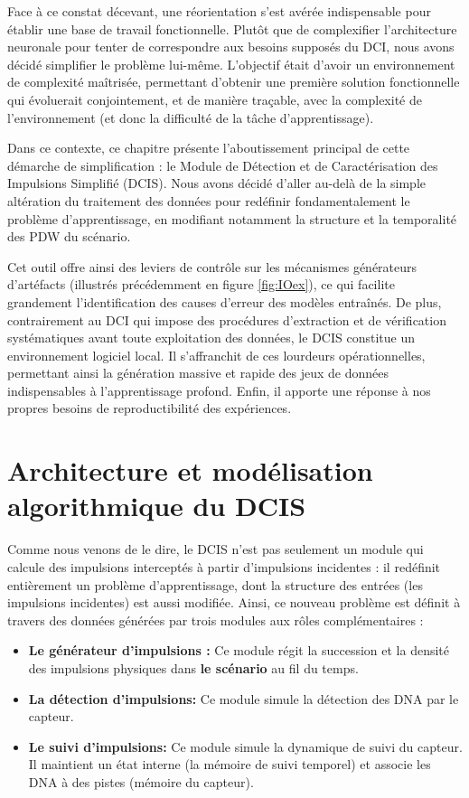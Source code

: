 Face à ce constat décevant, une réorientation s'est avérée indispensable pour établir une base de travail fonctionnelle. Plutôt que de complexifier l'architecture neuronale pour tenter de correspondre aux besoins supposés du DCI, nous avons décidé simplifier le problème lui-même. L'objectif était d'avoir un environnement de complexité maîtrisée, permettant d'obtenir une première solution fonctionnelle qui évoluerait conjointement, et de manière traçable, avec la complexité de l'environnement (et donc la difficulté de la tâche d'apprentissage).

Dans ce contexte, ce chapitre présente l'aboutissement principal de cette démarche de simplification : le Module de Détection et de Caractérisation des Impulsions Simplifié (DCIS). Nous avons décidé d'aller au-delà de la simple altération du traitement des données pour redéfinir fondamentalement le problème d'apprentissage, en modifiant notamment la structure et la temporalité des PDW du scénario.

Cet outil offre ainsi des leviers de contrôle sur les mécanismes générateurs d'artéfacts (illustrés précédemment en figure \ref{fig:IOex}), ce qui facilite grandement l'identification des causes d'erreur des modèles entraînés. De plus, contrairement au DCI qui impose des procédures d'extraction et de vérification systématiques avant toute exploitation des données, le DCIS constitue un environnement logiciel local. Il s'affranchit de ces lourdeurs opérationnelles, permettant ainsi la génération massive et rapide des jeux de données indispensables à l'apprentissage profond. Enfin, il apporte une réponse à nos propres besoins de reproductibilité des expériences.


\section{Architecture et modélisation algorithmique du DCIS}
Comme nous venons de le dire, le DCIS n'est pas seulement un module qui calcule des impulsions interceptés à partir d'impulsions incidentes : il redéfinit entièrement un problème d'apprentissage, dont la structure des entrées (les impulsions incidentes) est aussi modifiée. Ainsi, ce nouveau problème est définit à travers des données générées par trois modules aux rôles complémentaires :
\begin{itemize}
\item \textbf{Le générateur d'impulsions :} Ce module régit la succession et la densité des impulsions physiques dans \textbf{le scénario} au fil du temps.
\item \textbf{La détection d'impulsions:} Ce module simule la détection des DNA par le capteur.
\item \textbf{Le suivi d'impulsions:} Ce module simule la dynamique de suivi du capteur. Il maintient un état interne (la mémoire de suivi temporel) et associe les DNA à des pistes (mémoire du capteur).
\end{itemize}  
\; \\

